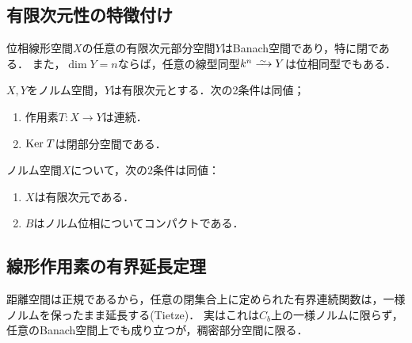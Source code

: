 \documentclass[uplatex,dvipdfmx]{jsreport}
\begin{document}
\subsection{有限次元性の特徴付け}

\begin{proposition}[自明なBanach部分空間]\label{prop-finite-subspaces}
    位相線形空間$X$の任意の有限次元部分空間$Y$はBanach空間であり，特に閉である．
    また，$\dim Y=n$ならば，任意の線型同型$k^n\iso Y$は位相同型でもある．
\end{proposition}

\begin{corollary}
    $X,Y$をノルム空間，$Y$は有限次元とする．次の2条件は同値；
    \begin{enumerate}
        \item 作用素$T:X\to Y$は連続．
        \item $\mathrm{Ker}\; T$は閉部分空間である．
    \end{enumerate}
\end{corollary}

\begin{proposition}
    ノルム空間$X$について，次の2条件は同値：
    \begin{enumerate}
        \item $X$は有限次元である．
        \item $B$はノルム位相についてコンパクトである．
    \end{enumerate}
\end{proposition}

\subsection{線形作用素の有界延長定理}

\begin{tcolorbox}[colframe=ForestGreen, colback=ForestGreen!10!white,breakable,colbacktitle=ForestGreen!40!white,coltitle=black,fonttitle=\bfseries\sffamily,
title=]
    距離空間は正規であるから，任意の閉集合上に定められた有界連続関数は，一様ノルムを保ったまま延長する(Tietze)．
    実はこれは$C_b$上の一様ノルムに限らず，任意のBanach空間上でも成り立つが，稠密部分空間に限る．
\end{tcolorbox}
\end{document}
